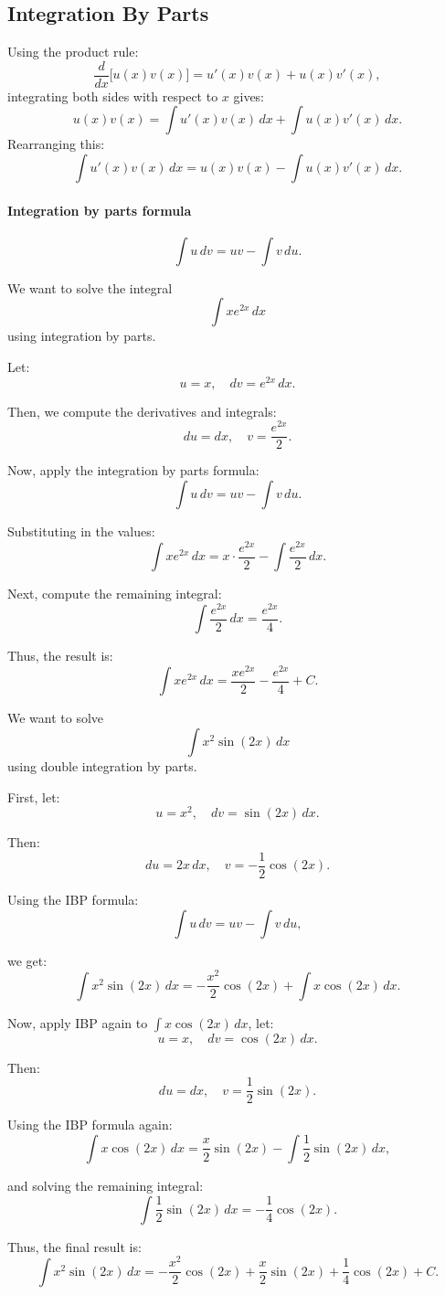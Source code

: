 \documentclass[11pt]{article}
\begin{document}
\subsection{Integration By Parts}
Using the product rule:
$$
\frac{d}{dx} \big[ u(x) v(x) \big] = u'(x)v(x) + u(x)v'(x),
$$
integrating both sides with respect to $x$ gives:
$$
u(x)v(x) = \int u'(x) v(x) \, dx + \int u(x) v'(x) \, dx.
$$
Rearranging this:
$$
\int u'(x) v(x) \, dx = u(x)v(x) - \int u(x) v'(x) \, dx.
$$

\paragraph{Integration by parts formula}
\begin{equation}
\int u \, dv = uv - \int v \, du.
\end{equation}
\begin{example}
We want to solve the integral $$ \int x e^{2x} \, dx $$ using integration by parts.

Let:
$$ u = x, \quad dv = e^{2x} \, dx. $$

Then, we compute the derivatives and integrals:
$$ du = dx, \quad v = \frac{e^{2x}}{2}. $$

Now, apply the integration by parts formula:
$$ \int u \, dv = uv - \int v \, du. $$

Substituting in the values:
$$ \int x e^{2x} \, dx = x \cdot \frac{e^{2x}}{2} - \int \frac{e^{2x}}{2} \, dx. $$

Next, compute the remaining integral:
$$ \int \frac{e^{2x}}{2} \, dx = \frac{e^{2x}}{4}. $$

Thus, the result is:
$$ \int x e^{2x} \, dx = \frac{x e^{2x}}{2} - \frac{e^{2x}}{4} + C. $$

\end{example}

\begin{example}
We want to solve $$ \int x^2 \sin(2x) \, dx $$ using double integration by parts.

First, let:
$$ u = x^2, \quad dv = \sin(2x) \, dx. $$

Then:
$$ du = 2x \, dx, \quad v = -\frac{1}{2} \cos(2x). $$

Using the IBP formula:
$$ \int u \, dv = uv - \int v \, du, $$

we get:
$$ \int x^2 \sin(2x) \, dx = -\frac{x^2}{2} \cos(2x) + \int x \cos(2x) \, dx. $$

Now, apply IBP again to \( \int x \cos(2x) \, dx \), let:
$$ u = x, \quad dv = \cos(2x) \, dx. $$

Then:
$$ du = dx, \quad v = \frac{1}{2} \sin(2x). $$

Using the IBP formula again:
$$ \int x \cos(2x) \, dx = \frac{x}{2} \sin(2x) - \int \frac{1}{2} \sin(2x) \, dx, $$

and solving the remaining integral:
$$ \int \frac{1}{2} \sin(2x) \, dx = -\frac{1}{4} \cos(2x). $$

Thus, the final result is:
$$ \int x^2 \sin(2x) \, dx = -\frac{x^2}{2} \cos(2x) + \frac{x}{2} \sin(2x) + \frac{1}{4} \cos(2x) + C. $$

\end{example}
\end{document}
